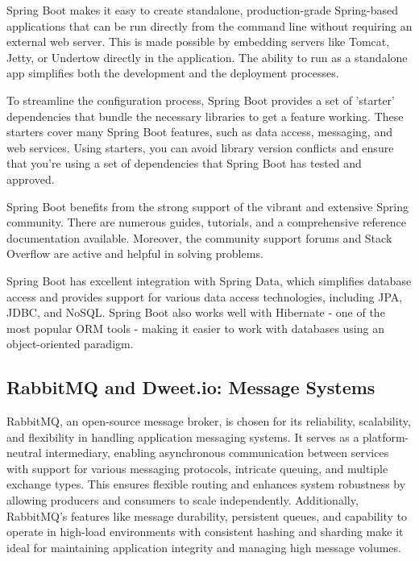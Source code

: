Spring Boot makes it easy to create standalone, production-grade Spring-based applications that can be run directly from the command line without requiring an external web server. 
This is made possible by embedding servers like Tomcat, Jetty, or Undertow directly in the application. 
The ability to run as a standalone app simplifies both the development and the deployment processes.

To streamline the configuration process, Spring Boot provides a set of 'starter' dependencies that bundle the necessary libraries to get a feature working. 
These starters cover many Spring Boot features, such as data access, messaging, and web services. 
Using starters, you can avoid library version conflicts and ensure that you're using a set of dependencies that Spring Boot has tested and approved.

Spring Boot benefits from the strong support of the vibrant and extensive Spring community. 
There are numerous guides, tutorials, and a comprehensive reference documentation available. 
Moreover, the community support forums and Stack Overflow are active and helpful in solving problems.

Spring Boot has excellent integration with Spring Data, which simplifies database access and provides support for various data access technologies, including JPA, JDBC, and NoSQL. 
Spring Boot also works well with Hibernate - one of the most popular ORM tools - making it easier to work with databases using an object-oriented paradigm.

\subsection{RabbitMQ and Dweet.io: Message Systems}

RabbitMQ, an open-source message broker, is chosen for its reliability, scalability, and flexibility in handling application messaging systems.\cite{RabbitamqpSpec} It serves as a platform-neutral intermediary, enabling asynchronous communication between services with support for various messaging protocols, intricate queuing, and multiple exchange types. This ensures flexible routing and enhances system robustness by allowing producers and consumers to scale independently. Additionally, RabbitMQ's features like message durability, persistent queues, and capability to operate in high-load environments with consistent hashing and sharding make it ideal for maintaining application integrity and managing high message volumes.

